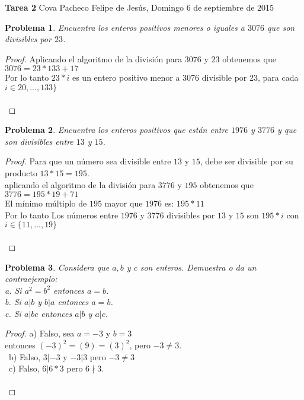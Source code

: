 \documentclass[12pt,oneside]{article}
\newtheorem{prob}{Problema}
\begin{document}
\begin{flushright}
{\large\textbf{Tarea 2} \textnormal{Cova Pacheco Felipe de Jes\'us}, \textnormal{Domingo 6 de septiembre de 2015}}
\end{flushright}

\begin{prob} %
Encuentra los enteros positivos menores o iguales a $3076$ que son divisibles por $23$.
\end{prob}

\begin{proof}
Aplicando el algoritmo de la divisi\'on para $3076$ y $23$ obtenemos que $3076 = 23 * 133 + 17$\\
Por lo tanto $23 * i$ es un entero positivo menor a $3076$ divisible por 23, para cada $i \in 20,...,133\}$\\\\
\end{proof}


\begin{prob} %
Encuentra los enteros positivos que est\'an entre $1976$ y $3776$ y que son divisibles entre $13$ y $15$.
\end{prob}

\begin{proof}
Para que un n\'umero sea divisible entre $13$ y $15$, debe ser divisible por su producto $13*15=195$.\\
aplicando el algoritmo de la divisi\'on para $3776$ y $195$ obtenemos que $3776 = 195*19+71$\\
El m\'inimo m\'ultiplo de $195$ mayor que $1976$ es: $195 * 11$\\
Por lo tanto Los n\'umeros entre $1976$ y $3776$ divisibles por $13$ y $15$ son $195*i$ con $i \in \{11,...,19\}$ \\\\
\end{proof}


\begin{prob} %
Considera que $a, b$ y $c$ son enteros. Demuestra o da un contraejemplo:\\
a. Si $a^2 =b^2$ entonces $a=b$.\\
b. Si $a|b$ y $b|a$ entonces $a=b$.\\
c. Si $a|bc$ entonces $a|b$ y $a|c$.
\end{prob}

\begin{proof}
a) Falso, sea $a = -3$ y $b = 3$\\
entonces $(-3)^2 = (9) = (3)^2$, pero $-3 \neq 3$.\\\
b) Falso, $3|-3$ y $-3|3$ pero $-3 \neq 3$\\\
c) Falso, $6|6*3$ pero $6\nmid3$.\\\\
\end{proof}
\end{document}
